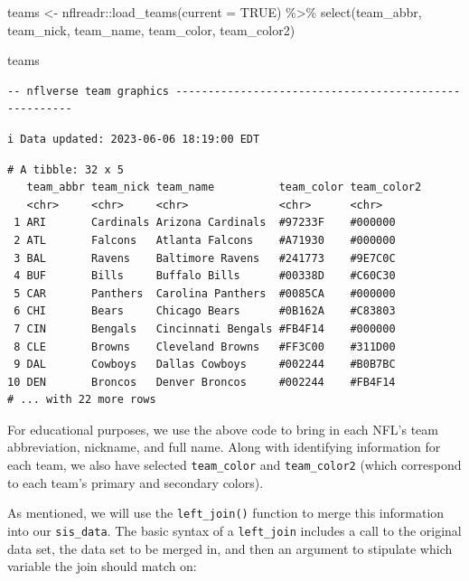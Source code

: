 \documentclass[
  letterpaper,
]{krantz}
\newenvironment{Shaded}{\begin{snugshade}}{\end{snugshade}}
\newcommand{\AttributeTok}[1]{\textcolor[rgb]{0.40,0.45,0.13}{#1}}
\newcommand{\ConstantTok}[1]{\textcolor[rgb]{0.56,0.35,0.01}{#1}}
\newcommand{\FunctionTok}[1]{\textcolor[rgb]{0.28,0.35,0.67}{#1}}
\newcommand{\NormalTok}[1]{\textcolor[rgb]{0.00,0.23,0.31}{#1}}
\newcommand{\OtherTok}[1]{\textcolor[rgb]{0.00,0.23,0.31}{#1}}
\newcommand{\SpecialCharTok}[1]{\textcolor[rgb]{0.37,0.37,0.37}{#1}}
\begin{document}
\begin{Shaded}
\begin{Highlighting}[]
\NormalTok{teams }\OtherTok{\textless{}{-}}\NormalTok{ nflreadr}\SpecialCharTok{::}\FunctionTok{load\_teams}\NormalTok{(}\AttributeTok{current =} \ConstantTok{TRUE}\NormalTok{) }\SpecialCharTok{\%\textgreater{}\%}
  \FunctionTok{select}\NormalTok{(team\_abbr, team\_nick, team\_name, team\_color, team\_color2)}

\NormalTok{teams}
\end{Highlighting}
\end{Shaded}

\begin{verbatim}
-- nflverse team graphics ------------------------------------------------------
\end{verbatim}

\begin{verbatim}
i Data updated: 2023-06-06 18:19:00 EDT
\end{verbatim}

\begin{verbatim}
# A tibble: 32 x 5
   team_abbr team_nick team_name          team_color team_color2
   <chr>     <chr>     <chr>              <chr>      <chr>      
 1 ARI       Cardinals Arizona Cardinals  #97233F    #000000    
 2 ATL       Falcons   Atlanta Falcons    #A71930    #000000    
 3 BAL       Ravens    Baltimore Ravens   #241773    #9E7C0C    
 4 BUF       Bills     Buffalo Bills      #00338D    #C60C30    
 5 CAR       Panthers  Carolina Panthers  #0085CA    #000000    
 6 CHI       Bears     Chicago Bears      #0B162A    #C83803    
 7 CIN       Bengals   Cincinnati Bengals #FB4F14    #000000    
 8 CLE       Browns    Cleveland Browns   #FF3C00    #311D00    
 9 DAL       Cowboys   Dallas Cowboys     #002244    #B0B7BC    
10 DEN       Broncos   Denver Broncos     #002244    #FB4F14    
# ... with 22 more rows
\end{verbatim}

For educational purposes, we use the above code to bring in each NFL's
team abbreviation, nickname, and full name. Along with identifying
information for each team, we also have selected \texttt{team\_color}
and \texttt{team\_color2} (which correspond to each team's primary and
secondary colors).

As mentioned, we will use the \texttt{left\_join()} function to merge
this information into our \texttt{sis\_data}. The basic syntax of a
\texttt{left\_join} includes a call to the original data set, the data
set to be merged in, and then an argument to stipulate which variable
the join should match on:
\end{document}
